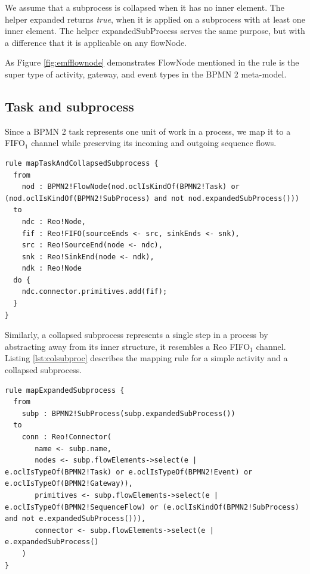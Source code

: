 We assume that a subprocess is collapsed when it has no inner element. The helper {expanded} returns \emph{true}, when it is applied on a subprocess with at least one inner element. The helper {expandedSubProcess} serves the same purpose, but with a difference that it is applicable on any flowNode.

As Figure \ref{fig:emfflownode} demonstrates {FlowNode} mentioned in the rule is the super type of  {activity}, {gateway}, and {event} types in the BPMN 2 meta-model. 

\subsection{Task and subprocess}
Since a BPMN 2 {task} represents one unit of work in a process, we map it to a {FIFO}$_1$ channel while preserving its incoming and outgoing sequence flows. %


\begin{lstlisting}[float,frame=single, caption=Mapping tasks and collapsed subprocesses,label=lst:colsubproc]
rule mapTaskAndCollapsedSubprocess {
  from
    nod : BPMN2!FlowNode(nod.oclIsKindOf(BPMN2!Task) or (nod.oclIsKindOf(BPMN2!SubProcess) and not nod.expandedSubProcess()))
  to
    ndc : Reo!Node,
    fif : Reo!FIFO(sourceEnds <- src, sinkEnds <- snk),
    src : Reo!SourceEnd(node <- ndc),
    snk : Reo!SinkEnd(node <- ndk),
    ndk : Reo!Node 
  do {  
    ndc.connector.primitives.add(fif);
  }
}
\end{lstlisting}


Similarly, a collapsed {subprocess} represents a single step in a process by abstracting away from its inner structure, it resembles a Reo {FIFO}$_1$ channel.               Listing \ref{lst:colsubproc} describes the mapping rule for a simple {activity} and a collapsed subprocess. 

\begin{lstlisting}[float,frame=single, caption=Mapping an expanded subprocess,label=lst:nestsubproc2subcon]
rule mapExpandedSubprocess {
  from
    subp : BPMN2!SubProcess(subp.expandedSubProcess())
  to
    conn : Reo!Connector(
       name <- subp.name, 
       nodes <- subp.flowElements->select(e | e.oclIsTypeOf(BPMN2!Task) or e.oclIsTypeOf(BPMN2!Event) or e.oclIsTypeOf(BPMN2!Gateway)),   
       primitives <- subp.flowElements->select(e |  e.oclIsTypeOf(BPMN2!SequenceFlow) or (e.oclIsKindOf(BPMN2!SubProcess) and not e.expandedSubProcess())),
       connector <- subp.flowElements->select(e | e.expandedSubProcess()
    )
}
\end{lstlisting}


